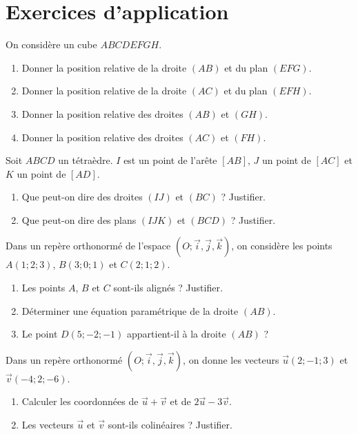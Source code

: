 \section{Exercices d'application}


\exo{}
On considère un cube $ABCDEFGH$. 
\begin{enumerate}[label=\alph*)]
\item Donner la position relative de la droite $(AB)$ et du plan $(EFG)$.
\item Donner la position relative de la droite $(AC)$ et du plan $(EFH)$.
\item Donner la position relative des droites $(AB)$ et $(GH)$.
\item Donner la position relative des droites $(AC)$ et $(FH)$.
\end{enumerate}

\exo{}
Soit $ABCD$ un tétraèdre. $I$ est un point de l'arête $[AB]$, $J$ un point de $[AC]$ et $K$ un point de $[AD]$. 
\begin{enumerate}[label=\alph*)]
\item Que peut-on dire des droites $(IJ)$ et $(BC)$ ? Justifier.
\item Que peut-on dire des plans $(IJK)$ et $(BCD)$ ? Justifier.
\end{enumerate}

\exo{}
Dans un repère orthonormé de l'espace $(O;\vec{i},\vec{j},\vec{k})$, on considère les points $A(1;2;3)$, $B(3;0;1)$ et $C(2;1;2)$.
\begin{enumerate}[label=\alph*)]
\item Les points $A$, $B$ et $C$ sont-ils alignés ? Justifier.
\item Déterminer une équation paramétrique de la droite $(AB)$.
\item Le point $D(5;-2;-1)$ appartient-il à la droite $(AB)$ ?
\end{enumerate}


\exo{}
Dans un repère orthonormé $(O;\vec{i},\vec{j},\vec{k})$, on donne les vecteurs $\vec{u}(2;-1;3)$ et $\vec{v}(-4;2;-6)$.
\begin{enumerate}[label=\alph*)]
\item Calculer les coordonnées de $\vec{u}+\vec{v}$ et de $2\vec{u}-3\vec{v}$.
\item Les vecteurs $\vec{u}$ et $\vec{v}$ sont-ils colinéaires ? Justifier.
\end{enumerate}


